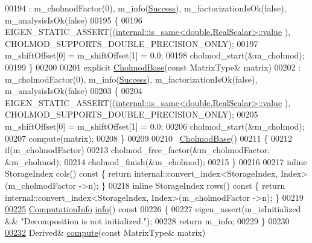\begin{DoxyCode}
00194       : m\_cholmodFactor(0), m\_info(\hyperlink{group__enums_gga85fad7b87587764e5cf6b513a9e0ee5ea52581b035f4b59c203b8ff999ef5fcea}{Success}), m\_factorizationIsOk(\textcolor{keyword}{false}), m\_analysisIsOk(\textcolor{keyword}{false})
00195     \{
00196       EIGEN\_STATIC\_ASSERT((\hyperlink{struct_eigen_1_1internal_1_1is__same}{internal::is\_same<double,RealScalar>::value}
      ), CHOLMOD\_SUPPORTS\_DOUBLE\_PRECISION\_ONLY);
00197       m\_shiftOffset[0] = m\_shiftOffset[1] = 0.0;
00198       cholmod\_start(&m\_cholmod);
00199     \}
00200 
00201     \textcolor{keyword}{explicit} \hyperlink{class_eigen_1_1_cholmod_base}{CholmodBase}(\textcolor{keyword}{const} MatrixType& matrix)
00202       : m\_cholmodFactor(0), m\_info(\hyperlink{group__enums_gga85fad7b87587764e5cf6b513a9e0ee5ea52581b035f4b59c203b8ff999ef5fcea}{Success}), m\_factorizationIsOk(\textcolor{keyword}{false}), m\_analysisIsOk(\textcolor{keyword}{false})
00203     \{
00204       EIGEN\_STATIC\_ASSERT((\hyperlink{struct_eigen_1_1internal_1_1is__same}{internal::is\_same<double,RealScalar>::value}
      ), CHOLMOD\_SUPPORTS\_DOUBLE\_PRECISION\_ONLY);
00205       m\_shiftOffset[0] = m\_shiftOffset[1] = 0.0;
00206       cholmod\_start(&m\_cholmod);
00207       compute(matrix);
00208     \}
00209 
00210     ~\hyperlink{class_eigen_1_1_cholmod_base}{CholmodBase}()
00211     \{
00212       \textcolor{keywordflow}{if}(m\_cholmodFactor)
00213         cholmod\_free\_factor(&m\_cholmodFactor, &m\_cholmod);
00214       cholmod\_finish(&m\_cholmod);
00215     \}
00216     
00217     \textcolor{keyword}{inline} StorageIndex cols()\textcolor{keyword}{ const }\{ \textcolor{keywordflow}{return} internal::convert\_index<StorageIndex, Index>(m\_cholmodFactor
      ->n); \}
00218     \textcolor{keyword}{inline} StorageIndex rows()\textcolor{keyword}{ const }\{ \textcolor{keywordflow}{return} internal::convert\_index<StorageIndex, Index>(m\_cholmodFactor
      ->n); \}
00219     
\hyperlink{class_eigen_1_1_cholmod_base_ada4cc43c64767d186fcb8997440cc753}{00225}     \hyperlink{group__enums_ga85fad7b87587764e5cf6b513a9e0ee5e}{ComputationInfo} \hyperlink{class_eigen_1_1_cholmod_base_ada4cc43c64767d186fcb8997440cc753}{info}()\textcolor{keyword}{ const}
00226 \textcolor{keyword}{    }\{
00227       eigen\_assert(m\_isInitialized && \textcolor{stringliteral}{"Decomposition is not initialized."});
00228       \textcolor{keywordflow}{return} m\_info;
00229     \}
00230 
\hyperlink{class_eigen_1_1_cholmod_base_abaf5be01b1e3035a4de0b19f5b63549e}{00232}     Derived& \hyperlink{class_eigen_1_1_cholmod_base_abaf5be01b1e3035a4de0b19f5b63549e}{compute}(\textcolor{keyword}{const} MatrixType& matrix)

\end{DoxyCode}
